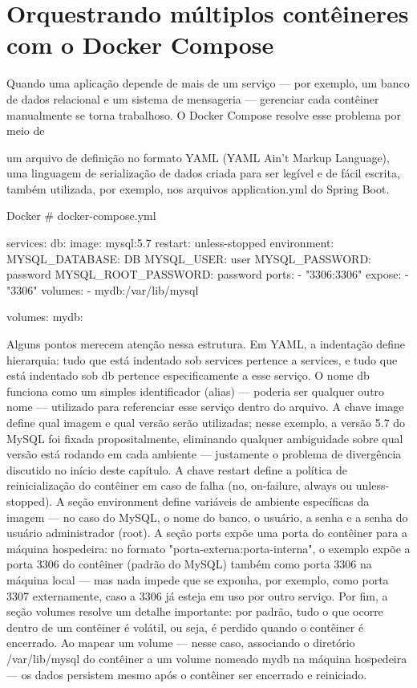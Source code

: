 \section{Orquestrando múltiplos contêineres com o Docker Compose}

Quando uma aplicação depende de mais de um serviço — por exemplo, um banco de dados relacional e um sistema de mensageria — gerenciar cada contêiner manualmente se torna trabalhoso. O Docker Compose resolve esse problema por meio de

um arquivo de definição no formato YAML (YAML Ain’t Markup Language), uma linguagem de serialização de dados criada para ser legível e de fácil escrita, também utilizada, por exemplo, nos arquivos application.yml do Spring Boot.

\begin{infobox}{Docker}
\# docker-compose.yml
\end{infobox}

\begin{infobox}{services:}
db: image: mysql:5.7 restart: unless-stopped environment: MYSQL\_DATABASE: DB MYSQL\_USER: user MYSQL\_PASSWORD: password MYSQL\_ROOT\_PASSWORD: password ports: - "3306:3306" expose: - "3306" volumes: - mydb:/var/lib/mysql
\end{infobox}

\begin{infobox}{volumes:}
mydb:
\end{infobox}

Alguns pontos merecem atenção nessa estrutura. Em YAML, a indentação define hierarquia: tudo que está indentado sob services pertence a services, e tudo que está indentado sob db pertence especificamente a esse serviço. O nome db funciona como um simples identificador (alias) — poderia ser qualquer outro nome — utilizado para referenciar esse serviço dentro do arquivo. A chave image define qual imagem e qual versão serão utilizadas; nesse exemplo, a versão 5.7 do MySQL foi fixada propositalmente, eliminando qualquer ambiguidade sobre qual versão está rodando em cada ambiente — justamente o problema de divergência discutido no início deste capítulo. A chave restart define a política de reinicialização do contêiner em caso de falha (no, on-failure, always ou unless-stopped). A seção environment define variáveis de ambiente específicas da imagem — no caso do MySQL, o nome do banco, o usuário, a senha e a senha do usuário administrador (root). A seção ports expõe uma porta do contêiner para a máquina hospedeira: no formato "porta-externa:porta-interna", o exemplo expõe a porta 3306 do contêiner (padrão do MySQL) também como porta 3306 na máquina local — mas nada impede que se exponha, por exemplo, como porta 3307 externamente, caso a 3306 já esteja em uso por outro serviço. Por fim, a seção volumes resolve um detalhe importante: por padrão, tudo o que ocorre dentro de um contêiner é volátil, ou seja, é perdido quando o contêiner é encerrado. Ao mapear um volume — nesse caso, associando o diretório /var/lib/mysql do contêiner a um volume nomeado mydb na máquina hospedeira — os dados persistem mesmo após o contêiner ser encerrado e reiniciado.

